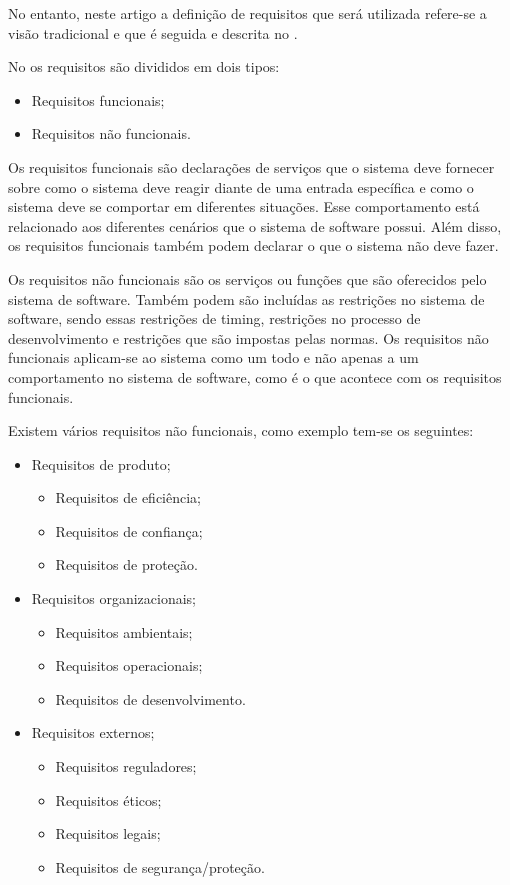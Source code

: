 \documentclass[a4paper,twoside]{article}
\begin{document}
No entanto, neste artigo a definição de requisitos que será utilizada refere-se a visão tradicional e que é seguida e descrita no \cite{Sommerville_2011_texbook}.

No \cite{Sommerville_2011_texbook} os requisitos são divididos em dois tipos:
\begin{itemize}
    \item Requisitos funcionais;
    \item Requisitos não funcionais.
\end{itemize}

Os requisitos funcionais são declarações de serviços que o sistema deve fornecer sobre como o sistema deve reagir diante de uma entrada específica e como o sistema deve se comportar em diferentes situações. 
Esse comportamento está relacionado aos diferentes cenários que o sistema de software possui. Além disso, os requisitos funcionais também podem declarar o que o sistema não deve fazer\cite{Sommerville_2011_texbook}.

Os requisitos não funcionais são os serviços ou funções que são oferecidos pelo sistema de software. Também podem são incluídas as restrições no sistema de software, sendo essas restrições de timing, restrições no processo de desenvolvimento e restrições que são impostas pelas normas. Os requisitos não funcionais aplicam-se ao sistema como um todo e não apenas a um comportamento no sistema de software, como é o que acontece com os requisitos funcionais\cite{Sommerville_2011_texbook}.

Existem vários requisitos não funcionais, como exemplo tem-se os seguintes\cite{Sommerville_2011_texbook}:
\begin{itemize}
    \item Requisitos de produto;
        \begin{itemize}
            \item Requisitos de eficiência;
            \item Requisitos de confiança;
            \item Requisitos de proteção.
        \end{itemize}
    \item Requisitos organizacionais;
    \begin{itemize}
        \item Requisitos ambientais;
        \item Requisitos operacionais;
        \item Requisitos de desenvolvimento.
    \end{itemize}
    \item Requisitos externos;
    \begin{itemize}
        \item Requisitos reguladores;
        \item Requisitos éticos;
        \item Requisitos legais;
        \item Requisitos de segurança/proteção.
    \end{itemize}
\end{itemize}
\end{document}
